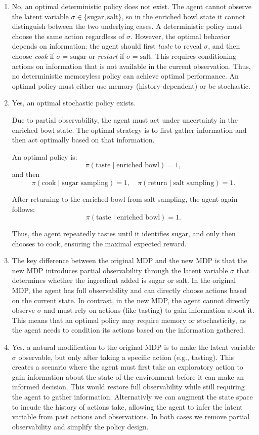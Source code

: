 \documentclass{article}
\begin{document}
\begin{enumerate}
\item 
No, an optimal deterministic policy does not exist.
The agent cannot observe the latent variable $\sigma \in \{\text{sugar}, \text{salt}\}$, so in the enriched bowl state it cannot distinguish between the two underlying cases. A deterministic policy must choose the same action regardless of $\sigma$.
However, the optimal behavior depends on information: the agent should first \emph{taste} to reveal $\sigma$, and then choose \emph{cook} if $\sigma=\text{sugar}$ or \emph{restart} if $\sigma=\text{salt}$. This requires conditioning actions on information that is not available in the current observation.
Thus, no deterministic memoryless policy can achieve optimal performance. An optimal policy must either use memory (history-dependent) or be stochastic.

\item
Yes, an optimal stochastic policy exists.

Due to partial observability, the agent must act under uncertainty in the enriched bowl state. The optimal strategy is to first gather information and then act optimally based on that information.

An optimal policy is:
\[
\pi(\text{taste} \mid \text{enriched bowl}) = 1,
\]
and then
\[
\pi(\text{cook} \mid \text{sugar sampling}) = 1, \quad
\pi(\text{return} \mid \text{salt sampling}) = 1.
\]

After returning to the enriched bowl from salt sampling, the agent again follows:
\[
\pi(\text{taste} \mid \text{enriched bowl}) = 1.
\]

Thus, the agent repeatedly tastes until it identifies sugar, and only then chooses to cook, ensuring the maximal expected reward.

\item
The key difference between the original MDP and the new MDP is that the new MDP introduces partial observability through the latent variable $\sigma$ that determines whether the ingredient added is sugar or salt. 
In the original MDP, the agent has full observability and can directly choose actions based on the current state.
In contrast, in the new MDP, the agent cannot directly observe $\sigma$ and must rely on actions (like tasting) to gain information about it.
This means that an optimal policy may require memory or stochasticity, as the agent needs to condition its actions based on the information gathered.

\item
Yes, a natural modification to the original MDP is to make the latent variable $\sigma$ observable, but only after taking a specific action (e.g., tasting). 
This creates a scenario where the agent must first take an exploratory action to gain information about the state of the environment before it can make an informed decision.
This would restore full observability while still requiring the agent to gather information. 
Alternativly we can augment the state space to incude the history of actions take, allowing the agent to infer the latent variable from past actions and observations. 
In both cases we remove partial observability and simplify the policy design. 

\end{enumerate}
\end{document}
